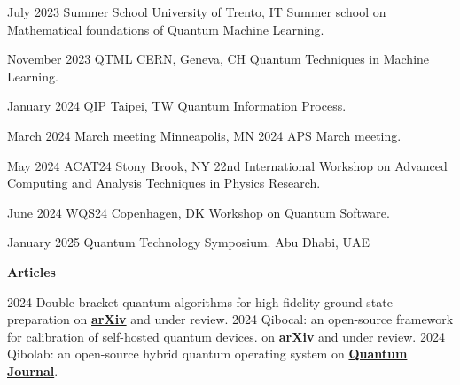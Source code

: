 \documentclass[9pt]{developercv} %
\begin{document}
\begin{entrylist}

    \entry
        {July 2023}
        {Summer School}
        {University of Trento, IT}
        {Summer school on Mathematical foundations of Quantum Machine Learning.}
        {}
         
    \entry
        {November 2023}
        {QTML}
        {CERN, Geneva, CH}
        {Quantum Techniques in Machine Learning.}
        {}

    \entry
        {January 2024}
        {QIP}
        {Taipei, TW}
        {Quantum Information Process.}
        {}

    \entry
        {March 2024}
        {March meeting}
        {Minneapolis, MN}
        {2024 APS March meeting.}
        {}

    \entry
        {May 2024}
        {ACAT24}
        {Stony Brook, NY}
        {22nd International Workshop on Advanced Computing and Analysis Techniques in Physics Research.}
        {}

    \entry
        {June 2024}
        {WQS24}
        {Copenhagen, DK}
        {Workshop on Quantum Software.}
        {}

    \entry
        {January 2025}
        {Quantum Technology Symposium.}
        {Abu Dhabi, UAE}
        {}
        {}
\end{entrylist}




\textbf{Articles} \\

\begin{entrylist}
    \entry
        {2024}
        {Double-bracket quantum algorithms for high-fidelity ground state preparation}
        {}
        {on \href{https://doi.org/10.48550/arXiv.2408.03987}{\textbf{arXiv}} and under review.} 
    \entry
        {2024}
        {Qibocal: an open-source framework for calibration of self-hosted quantum devices.}
        {}
        {on \href{https://doi.org/10.48550/arXiv.2410.00101}{\textbf{arXiv}} and under review.} 
        {}
    \entry
        {2024}
        {Qibolab: an open-source hybrid quantum operating system}
        {}
        {on \href{https://quantum-journal.org/papers/q-2024-02-12-1247}{\textbf{Quantum Journal}}.} 
        {}
\end{entrylist}
\end{document}
